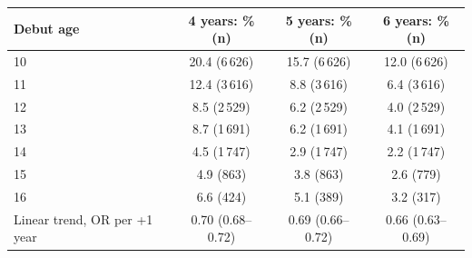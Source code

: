 \begin{tabular}{lccc}
\toprule
Debut age & 4 years: \% (n) & 5 years: \% (n) & 6 years: \% (n) \\
\midrule
10 & 20.4 (6\,626) & 15.7 (6\,626) & 12.0 (6\,626) \\
11 & 12.4 (3\,616) & 8.8 (3\,616) & 6.4 (3\,616) \\
12 & 8.5 (2\,529) & 6.2 (2\,529) & 4.0 (2\,529) \\
13 & 8.7 (1\,691) & 6.2 (1\,691) & 4.1 (1\,691) \\
14 & 4.5 (1\,747) & 2.9 (1\,747) & 2.2 (1\,747) \\
15 & 4.9 (863) & 3.8 (863) & 2.6 (779) \\
16 & 6.6 (424) & 5.1 (389) & 3.2 (317) \\
\midrule
Linear trend, OR per +1 year & 0.70 (0.68--0.72) & 0.69 (0.66--0.72) & 0.66 (0.63--0.69) \\
\bottomrule
\end{tabular}
